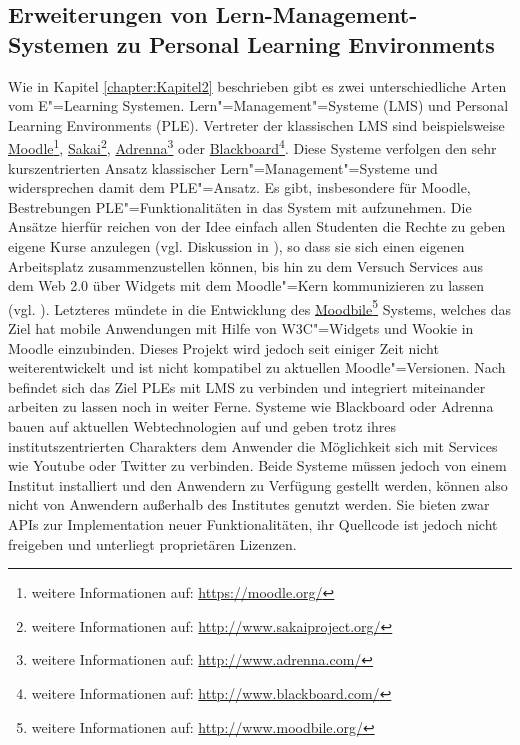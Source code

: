 \subsection{Erweiterungen von Lern-Management-Systemen zu Personal Learning Environments}
Wie in Kapitel \ref{chapter:Kapitel2} beschrieben gibt es zwei unterschiedliche Arten vom E"=Learning Systemen. Lern"=Management"=Systeme (LMS) und Personal Learning Environments (PLE). Vertreter der klassischen LMS sind beispielsweise \href{https://moodle.org/}{Moodle}\footnote{weitere Informationen auf: \url{https://moodle.org/}}, \href{http://www.sakaiproject.org/}{Sakai}\footnote{weitere Informationen auf: \url{http://www.sakaiproject.org/}}, \href{http://www.adrenna.com/}{Adrenna}\footnote{weitere Informationen auf: \url{http://www.adrenna.com/}} oder \href{http://www.blackboard.com/}{Blackboard}\footnote{weitere Informationen auf: \url{http://www.blackboard.com/}}. Diese Systeme verfolgen den sehr kurszentrierten Ansatz klassischer Lern"=Management"=Systeme und widersprechen damit dem PLE"=Ansatz. Es gibt, insbesondere für Moodle, Bestrebungen PLE"=Funktionalitäten in das System mit aufzunehmen. Die Ansätze hierfür reichen von der Idee einfach allen Studenten die Rechte zu geben eigene Kurse anzulegen (vgl. Diskussion in \cite{MoodleForum2009}), so dass sie sich einen eigenen Arbeitsplatz zusammenzustellen können, bis hin zu dem Versuch Services aus dem Web 2.0 über Widgets mit dem Moodle"=Kern kommunizieren zu lassen (vgl. \cite{Penalvo2011}). Letzteres mündete in die Entwicklung des \href{http://www.moodbile.org/}{Moodbile}\footnote{weitere Informationen auf: \url{http://www.moodbile.org/}} Systems, welches das Ziel hat mobile Anwendungen mit Hilfe von W3C"=Widgets und Wookie in Moodle einzubinden. Dieses Projekt wird jedoch seit einiger Zeit nicht weiterentwickelt und ist nicht kompatibel zu aktuellen Moodle"=Versionen. Nach \cite{Penalvo2011} befindet sich das Ziel PLEs mit LMS zu verbinden und integriert miteinander arbeiten zu lassen noch in weiter Ferne. Systeme wie Blackboard oder Adrenna bauen auf aktuellen Webtechnologien auf und geben trotz ihres institutszentrierten Charakters dem Anwender die Möglichkeit sich mit Services wie Youtube oder Twitter zu verbinden. Beide Systeme müssen jedoch von einem Institut installiert und den Anwendern zu Verfügung gestellt werden, können also nicht von Anwendern außerhalb des Institutes genutzt werden. Sie bieten zwar APIs zur Implementation neuer Funktionalitäten, ihr Quellcode ist jedoch nicht freigeben und unterliegt proprietären Lizenzen.

